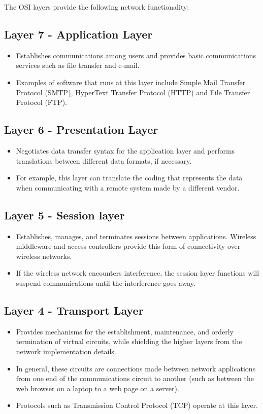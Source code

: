 The OSI layers provide the following network functionality:

\subsection*{Layer 7 - Application Layer}
\begin{itemize}
	\item Establishes communications among users and provides basic communications services such as file transfer and e-mail. 
	\item Examples of software that runs at this layer include Simple Mail Transfer Protocol (SMTP), HyperText Transfer Protocol (HTTP) and File Transfer Protocol (FTP).
\end{itemize}


\subsection*{Layer 6 - Presentation Layer} 
\begin{itemize}
	\item Negotiates data transfer syntax for the application layer and performs translations between different data formats, if necessary. 
	\item For example, this layer can translate the coding that represents the data when communicating with a remote system made by a different vendor. 
\end{itemize}


\subsection*{Layer 5 - Session layer}
\begin{itemize}
	\item Establishes, manages, and terminates sessions between applications. Wireless middleware and access controllers provide this form of connectivity over wireless networks. 
	\item If the wireless network encounters interference, the session layer functions will suspend communications until the interference goes away.
\end{itemize}


\subsection*{Layer 4 - Transport Layer}
\begin{itemize}
	\item Provides mechanisms for the establishment, maintenance, and orderly termination of virtual circuits, while shielding the higher layers from the network implementation details. 
	\item In general, these circuits are connections made between network applications from one end of the communications circuit to another (such as between the web browser on a laptop to a web page on a server). 
	\item Protocols such as Transmission Control Protocol (TCP) operate at this layer. 
\end{itemize}


